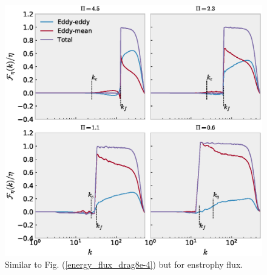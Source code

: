 \documentclass{ametsoc}
\begin{document}
\begin{figure}
\begin{center}
\includegraphics[width=6in]{enstrophy_flux_drag8e-4}\caption{Similar to Fig. (\ref{energy_flux_drag8e-4}) but for enstrophy flux.}
\label{enstrophy_flux_drag8e-4}
\end{center}
\end{figure}
\end{document}
